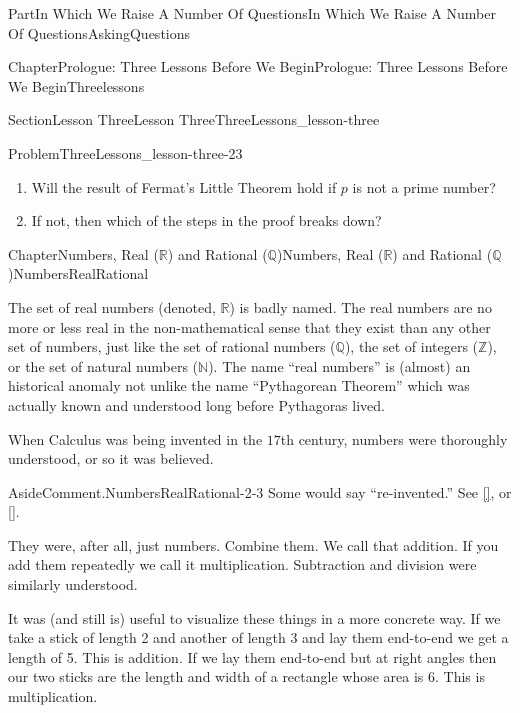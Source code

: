\documentclass[oneside,10pt,]{book}
\newcommand{\xreffont}{\relax}
\numberwithin{equation}{part}
\newcommand{\RR}{\mathbb {R}}
\newcommand{\QQ}{\mathbb {Q}}
\newcommand{\NN}{\mathbb {N}}
\newcommand{\ZZ}{\mathbb {Z}}
\begin{document}
\begin{partptx}{Part}{In Which We Raise A Number Of Questions}{}{In Which We Raise A Number Of Questions}{}{}{AskingQuestions}
\begin{chapterptx}{Chapter}{Prologue: Three Lessons Before We Begin}{}{Prologue: Three Lessons Before We Begin}{}{}{Threelessons}
\begin{sectionptx}{Section}{Lesson Three}{}{Lesson Three}{}{}{ThreeLessons_lesson-three}
\begin{problem}{Problem}{}{ThreeLessons_lesson-three-23}
\begin{enumerate}[font=\bfseries,label=(\alph*),ref=\alph*]%
\item{}Will the result of Fermat's Little Theorem hold if \(p\) is not a prime number?%
\item{}If not, then which of the steps in the proof breaks down?%
\end{enumerate}%
\end{problem}
\end{sectionptx}
\end{chapterptx}
%
%
\typeout{************************************************}
\typeout{Chapter 2 Numbers, Real (\(\RR\)) and Rational (\(\QQ\))}
\typeout{************************************************}
%
\begin{chapterptx}{Chapter}{Numbers, Real (\(\RR\)) and Rational (\(\QQ\))}{}{Numbers, Real (\(\RR\)) and Rational (\(\QQ\))}{}{}{NumbersRealRational}
\renewcommand*{\chaptername}{Chapter}
\begin{introduction}{}%
The set of real numbers (denoted, \(\RR\)) is badly named. The real numbers are no more or less real \textemdash{} in the non-mathematical sense that they exist \textemdash{} than any other set of numbers, just like the set of rational numbers (\(\QQ\)), the set of integers (\(\ZZ\)), or the set of natural numbers (\(\NN\)). The name ``real numbers'' is (almost) an historical anomaly not unlike the name ``Pythagorean Theorem'' which was actually known and understood long before Pythagoras lived.%
\par
When Calculus was being invented in the \(17\)th century, numbers were thoroughly understood, or so it was believed.%
\begin{aside}{Aside}{Comment.}{NumbersRealRational-2-3}%
Some would say ``re-invented.'' See \hyperlink{russo96__forgot_revol}{[{\xreffont 13}]}, or \hyperlink{netz07__archim_codex}{[{\xreffont 9}]}.  %
\end{aside}
They were, after all, just numbers. Combine them. We call that addition. If you add them repeatedly we call it multiplication. Subtraction and division were similarly understood.%
\par
It was (and still is) useful to visualize these things in a more concrete way. If we take a stick of length 2 and another of length 3 and lay them end-to-end we get a length of 5. This is addition. If we lay them end-to-end but at right angles then our two sticks are the length and width of a rectangle whose area is 6. This is multiplication.%
\par

\end{introduction}
\end{chapterptx}
\end{partptx}
\end{document}
